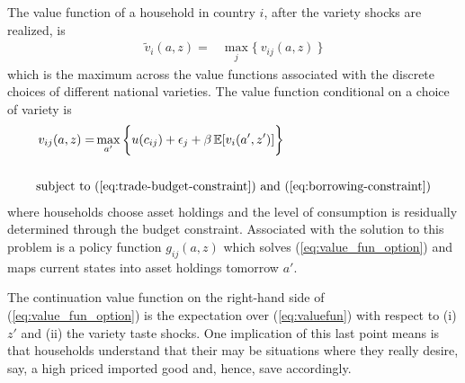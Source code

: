 \documentclass[12pt,pdftex]{article}
\begin{document}
\begin{onehalfspacing}
The value function of a household in country $i$, after the variety shocks are realized, is
\begin{align}
\tilde{v}_{i}(a, z) = &  \max_{j} \big  \{ \  v_{ij}(a, z)  \ \big \}
\label{eq:valuefun}
\end{align}
which is the maximum across the value functions associated with the discrete choices of different national varieties. The value function conditional on a choice of variety is
\begin{align}
v_{ij}(a, z) = &  \max_{\ a' \ }\bigg  \{ u(c_{ij}) + \epsilon_{j}  + \beta \, \mathbb{E} [v_{i}(a', z')]  \bigg\} 
\label{eq:value_fun_option} \\
\nonumber \\
\mbox{subject to}  \ & (\ref{eq:trade-budget-constraint}) \  \mathrm{and} \ (\ref{eq:borrowing-constraint}) \nonumber
\end{align}
where households choose asset holdings and the level of consumption is residually determined through the budget constraint. Associated with the solution to this problem is a policy function $g_{ij}(a,z)$ which solves (\ref{eq:value_fun_option}) and maps current states into asset holdings tomorrow $a'$. 

The continuation value function on the right-hand side of (\ref{eq:value_fun_option}) is the expectation over (\ref{eq:valuefun}) with respect to (i) $z'$ and (ii) the variety taste shocks. One implication of this last point means is that households understand that their may be situations where they really desire, say, a high priced imported good and, hence, save accordingly.


\end{onehalfspacing}
\end{document}
